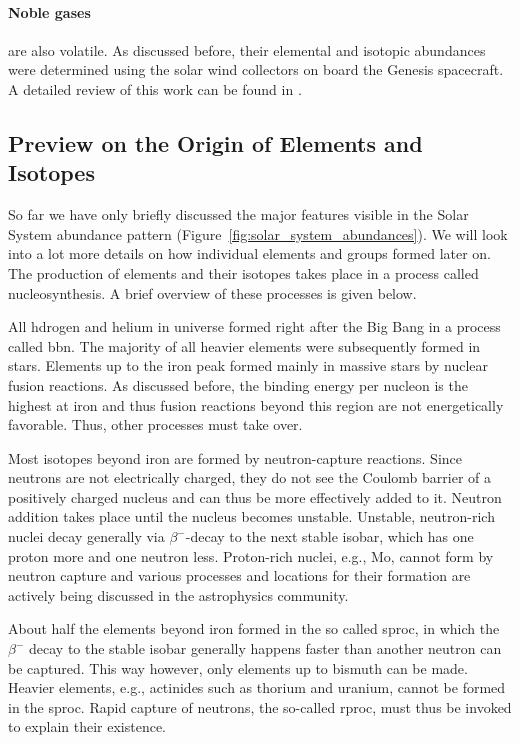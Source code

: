\paragraph{Noble gases} are also volatile. As discussed before, their elemental and isotopic abundances were determined using the solar wind collectors on board the Genesis spacecraft. A detailed review of this work can be found in \citet{heber09}.



\subsection{Preview on the Origin of Elements and Isotopes}

So far we have only briefly discussed the major features visible in the Solar System abundance pattern (Figure~\ref{fig:solar_system_abundances}). We will look into a lot more details on how individual elements and groups formed later on. The production of elements and their isotopes takes place in a process called nucleosynthesis. A brief overview of these processes is given below.

All hdrogen and helium in universe formed right after the Big Bang in a process called \acl{bbn}. The majority of all heavier elements were subsequently formed in stars. Elements up to the iron peak formed mainly in massive stars by nuclear fusion reactions. As discussed before, the binding energy per nucleon is the highest at iron and thus fusion reactions beyond this region are not energetically favorable. Thus, other processes must take over. 

Most isotopes beyond iron are formed by neutron-capture reactions. Since neutrons are not electrically charged, they do not see the Coulomb barrier of a positively charged nucleus and can thus be more effectively added to it. Neutron addition takes place until the nucleus becomes unstable. Unstable, neutron-rich nuclei decay generally via $\beta^{-}$-decay to the next stable isobar, which has one proton more and one neutron less. Proton-rich nuclei, e.g., Mo, cannot form by neutron capture and various processes and locations for their formation are actively being discussed in the astrophysics community.

About half the elements beyond iron formed in the so called \ac{sproc}, in which the $\beta^{-}$ decay to the stable isobar generally happens faster than another neutron can be captured. This way however, only elements up to bismuth can be made. Heavier elements, e.g., actinides such as thorium and uranium, cannot be formed in the \ac{sproc}. Rapid capture of neutrons, the so-called \ac{rproc}, must thus be invoked to explain their existence.



